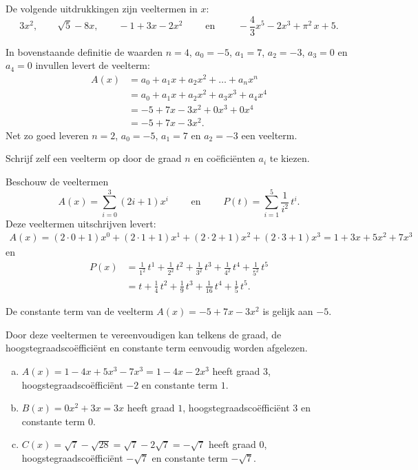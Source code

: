 \documentclass{ximera}
\begin{document}
\begin{example} 
De volgende uitdrukkingen zijn veeltermen in $x$:
\[
3x^2, 
\qquad \sqrt{5} - 8x, 
\qquad -1 + 3x -2x^2 
\qquad \text{ en } \qquad -\frac{4}{3}x^5 - 2x^3 + \pi^2\,x + 5. 
\]      
\end{example} 
    

\begin{example} 
In bovenstaande definitie de waarden $n = 4$, $a_0 = -5$, $a_1 = 7$, $a_2 = -3$, $a_3 = 0$ en $a_4 = 0$ invullen levert de veelterm: 
\begin{align*}
A(x) 
& = a_0 + a_1x + a_2x^2 + \dots + a_n x^n \\
& = a_0 + a_1x + a_2x^2 + a_3 x^3 + a_4 x^4 \\ 
& = -5 + 7x - 3x^2 + 0x^3 + 0x^4 \\
& = -5 + 7x - 3x^2.
\end{align*}
Net zo goed leveren $n = 2$, $a_0 = -5$, $a_1 = 7$ en $a_2 = -3$ een veelterm.
\end{example} 

\begin{exercise}
Schrijf zelf een veelterm op door de graad \(n\) en coëficiënten \(a_i\) te kiezen.
\end{exercise}

\begin{example} 
Beschouw de veeltermen
\[
A(x) = \sum_{i=0}^3 (2i+1) x^i \qquad \text{ en } \qquad P(t) = \sum_{i=1}^5 \frac{1}{i^2} \, t^i.
\] 
Deze veeltermen uitschrijven levert: 
\begin{align*}
A(x)  = (2\cdot0+1)x^0 + (2\cdot1+1)x^1 + (2\cdot2+1)x^2 + (2\cdot3+1)x^3 = 1 + 3x + 5x^2 + 7x^3
\end{align*}
en
\begin{align*}
P(x) 
& = \frac{1}{1^2} \, t^1 + \frac{1}{2^2} \, t^2 + \frac{1}{3^2} \, t^3 + \frac{1}{4^2} \, t^4 + \frac{1}{5^2} \, t^5 \\
& = t + \frac{1}{4}\,t^2 + \frac{1}{9}\,t^3 + \frac{1}{16}\,t^4 + \frac{1}{5}\,t^5.
\end{align*}
\end{example} 



\begin{example} 
De constante term van de veelterm $A(x) = -5 + 7x - 3x^2$ is gelijk aan $-5$.  
\end{example} 


\begin{example} 
Door deze veeltermen te vereenvoudigen kan telkens de graad, de hoogstegraadscoëfficiënt en constante term eenvoudig worden afgelezen. 
\begin{enumerate}[(a)]
\item
$A(x) = 1-4x+5x^3-7x^3 = 1 - 4x - 2x^3$ heeft graad $3$, hoogstegraadscoëfficiënt $-2$ en constante term $1$.
\item
$B(x) = 0x^2 + 3x = 3x$ heeft graad $1$, hoogstegraadscoëfficiënt $3$ en constante term $0$.
\item
$C(x) = \sqrt{7}-\sqrt{28} = \sqrt{7}-2\sqrt{7} = -\sqrt{7}$ heeft graad $0$, hoogstegraadscoëfficiënt $-\sqrt{7}$ en constante term $-\sqrt{7}$.
\end{enumerate}
\end{example} 
\end{document}
